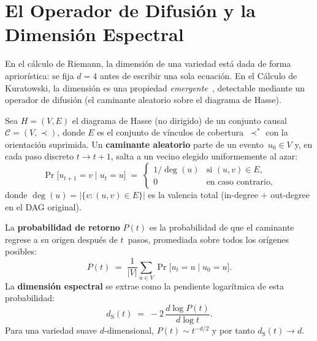 \documentclass[11pt, a4paper, openany]{book}
\newcommand{\dS}{d_{\mathrm{S}}}
\newcommand{\covers}{\prec^{\!*}}
\begin{document}
\section{El Operador de Difusi\'on y la Dimensi\'on Espectral}

En el c\'alculo de Riemann, la dimensi\'on de una variedad est\'a dada
de forma aprior\'istica: se fija $d = 4$ antes de escribir una sola
ecuaci\'on. En el C\'alculo de Kuratowski, la dimensi\'on es una
propiedad
\emph{emergente}~\cite{carlip2017,ambjorn2005,eichhorn2014},
detectable mediante un operador de difusi\'on (el caminante aleatorio
sobre el diagrama de Hasse).

\begin{definition}
\label{def:random-walker}
Sea $H = (V, E)$ el diagrama de Hasse (no dirigido) de un conjunto
causal $\mathcal{C} = (V, \prec)$, donde $E$ es el conjunto de
v\'inculos de cobertura~$\covers$ con la orientaci\'on suprimida.
Un \textbf{caminante aleatorio} parte de un evento~$u_0 \in V$ y, en
cada paso discreto $t \to t+1$, salta a un vecino elegido
uniformemente al azar:
\[
  \Pr\bigl[u_{t+1} = v \;\big|\; u_t = u\bigr]
  \;=\;
  \begin{cases}
    1/\deg(u) & \text{si } (u,v) \in E,\\[2pt]
    0 & \text{en caso contrario,}
  \end{cases}
\]
donde $\deg(u) = |\{v : (u,v) \in E\}|$ es la valencia total
(in-degree $+$ out-degree en el DAG original).
\end{definition}

\begin{definition}
\label{def:spectral-dimension}
La \textbf{probabilidad de retorno} $P(t)$ es la probabilidad de que
el caminante regrese a su origen despu\'es de $t$~pasos, promediada
sobre todos los or\'igenes posibles:
\[
  P(t) \;=\; \frac{1}{|V|}\sum_{u \in V}
  \Pr\bigl[u_t = u \;\big|\; u_0 = u\bigr].
\]
La \textbf{dimensi\'on espectral} se extrae como la pendiente
logar\'itmica de esta probabilidad:
\begin{equation}
  \boxed{\;
  \dS(t) \;=\; -2\,\frac{d\log P(t)}{d\log t}.
  \;}
  \label{eq:spectral-dim}
\end{equation}
Para una variedad suave $d$-dimensional, $P(t) \sim t^{-d/2}$
y por tanto $\dS(t) \to d$.
\end{definition}
\end{document}

